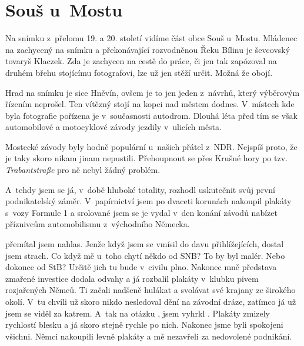 
\chapter{Souš u~Mostu}

Na snímku z~přelomu 19. a 20. století vidíme část obce Souš u~Mostu. Mládenec
na zachycený na snímku a překonávající rozvodněnou Řeku Bílinu je ševcovský
tovaryš Klaczek. Zda je zachycen na cestě do práce, či jen tak zapózoval na
druhém břehu stojícímu fotografovi, lze už jen stěží určit. Možná že obojí.

Hrad na snímku je sice Hněvín, ovšem je to jen jeden z~návrhů, který výběrovým
řízením neprošel. Ten vítězný stojí na kopci nad městem dodnes. V~místech kde
byla fotografie pořízena je v~současnosti autodrom. Dlouhá léta před tím se
však automobilové a motocyklové závody jezdily v~ulicích města.

Mostecké závody byly hodně populární u~našich přátel z~NDR. Nejspíš proto, že
je taky skoro nikam jinam nepustili. Přehoupnout se přes Krušné hory po tzv.
{\em Trabantstraße} pro ně nebyl žádný problém.

A~tehdy jsem se já, v~době hluboké totality, rozhodl uskutečnit svůj první
podnikatelský záměr. V~papírnictví jsem po dvaceti korunách nakoupil plakáty
s~vozy Formule 1 a srolované jsem se je vydal v~den konání závodů nabízet
příznivcům automobilismu z~východního Německa.

 přemítal
jsem nahlas. Jenže když jsem se vmísil do davu přihlížejících, dostal jsem
strach. Co když mě u~toho chytí někdo od SNB? To by byl malér. Nebo dokonce od
StB? Určitě jich tu bude v~civilu plno. Nakonec mně představa zmařené investice
dodala odvahy a já rozbalil plakáty v~klubku pivem rozjařených Němců. Ti začali
nadšeně hulákat a svolávat své krajany ze širokého okolí. V~tu chvíli už skoro
nikdo nesledoval dění na závodní dráze, zatímco já už jsem se viděl za katrem.
A~tak na otázku , jsem vyhrkl . Plakáty zmizely
rychlostí blesku a já skoro stejně rychle po nich. Nakonec jsme byli spokojeni
všichni. Němci nakoupili levně plakáty a mě nezavřeli za nedovolené podnikání.

